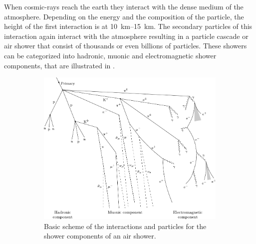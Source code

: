 When cosmic-rays reach the earth they interact with the dense medium of the atmosphere.
Depending on the energy and the composition of the particle, the height of the first interaction is at \SIrange{10}{15}{km}.
The secondary particles of this interaction again interact with the atmosphere resulting in a particle cascade or air shower that consist of thousands or even billions of particles.
These showers can be categorized into hadronic, muonic and electromagnetic shower components, that are illustrated in .

\begin{figure}
    \centering
    \begin{subfigure}[t]{0.47\textwidth}
        \centering
        \includegraphics[width=\textwidth]{./images/air_shower_components.pdf}
        \caption{Basic scheme of the interactions and particles for the shower components of an air shower. \cite{Barrantes18EAS}}
        \label{fig:air_shower_components}
    \end{subfigure}
    \hfill
    \begin{subfigure}[t]{0.47\textwidth}
        \centering

\end{subfigure}
\end{figure}
